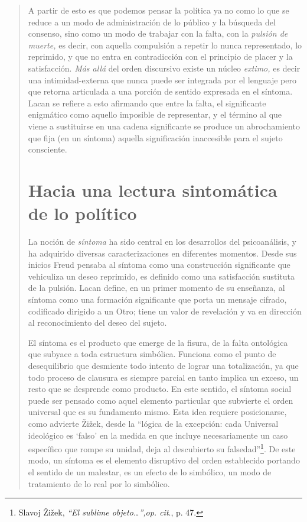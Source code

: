 \begin{quote}
A partir de esto es que podemos pensar la política ya no como lo que se reduce a un modo de administración de lo público y la búsqueda del consenso, sino como un modo de trabajar con la falta, con la \emph{pulsión de muerte,} es decir, con aquella compulsión a repetir lo nunca representado, lo reprimido, y que no entra en contradicción con el principio de placer y la satisfacción. \emph{Más allá} del orden discursivo existe un núcleo \emph{extimo,} es decir una intimidad-externa que nunca puede ser integrada por el lenguaje pero que retorna articulada a una porción de sentido expresada en el síntoma. Lacan se refiere a esto afirmando que entre la falta, el significante enigmático como aquello imposible de representar, y el término al que viene a sustituirse en una cadena significante se produce un abrochamiento que fija (en un síntoma) aquella significación inaccesible para el sujeto consciente.

\section{Hacia una lectura sintomática de lo político}

La noción de \emph{síntoma} ha sido central en los desarrollos del psicoanálisis, y ha adquirido diversas caracterizaciones en diferentes momentos. Desde sus inicios Freud pensaba al síntoma como una construcción significante que vehiculiza un deseo reprimido, es definido como una satisfacción sustituta de la pulsión. Lacan define, en un primer momento de su enseñanza, al síntoma como una formación significante que porta un mensaje cifrado, codificado dirigido a un Otro; tiene un valor de revelación y va en dirección al reconocimiento del deseo del sujeto.

El síntoma es el producto que emerge de la fisura, de la falta ontológica que subyace a toda estructura simbólica. Funciona como el punto de desequilibrio que desmiente todo intento de lograr una totalización, ya que todo proceso de clausura es siempre parcial en tanto implica un exceso, un resto que se desprende como producto. En este sentido, el síntoma social puede ser pensado como aquel elemento particular que subvierte el orden universal que es su fundamento mismo. Esta idea requiere posicionarse, como advierte Žižek, desde la \enquote{lógica de la excepción: cada Universal ideológico es \enquote{falso} en la medida en que incluye necesariamente un caso específico que rompe su unidad, deja al descubierto su falsedad}\footnote{Slavoj Žižek, \emph{\enquote{El sublime objeto\ldots},op. cit}., p. 47.}. De este modo, un síntoma es el elemento disruptivo del orden establecido portando el sentido de un malestar, es un efecto de lo simbólico, un modo de tratamiento de lo real por lo simbólico.


\end{quote}
